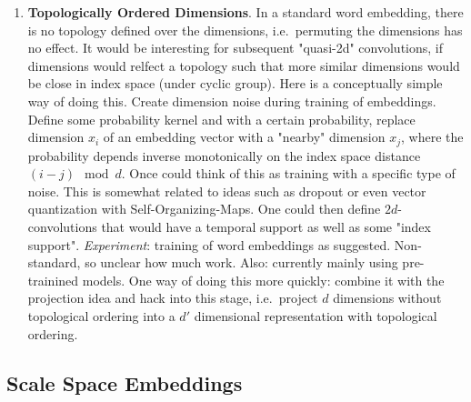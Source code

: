 \documentclass{article}
\begin{document}
\begin{enumerate}
\item \textbf{Topologically Ordered Dimensions}. In a standard word embedding, there is no topology defined over the dimensions, i.e.~permuting the dimensions has no effect. It would be interesting for subsequent "quasi-2d" convolutions, if dimensions would relfect a topology such that more similar dimensions would be close in index space (under cyclic group).  Here is a conceptually simple way of doing this. Create dimension noise during training of embeddings. Define some probability kernel and with a certain probability, replace  dimension $x_i$ of an embedding vector with a "nearby" dimension $x_j$, where the probability depends inverse monotonically on the index space distance $(i-j) \mod  d$. Once could think of this as training with a specific type of noise. This is somewhat related to ideas such as dropout or even vector quantization with Self-Organizing-Maps. One could then define $2d$-convolutions that would have a temporal support as well as some "index support". \textit{Experiment}: training of word embeddings as suggested. Non-standard, so unclear how much work. Also: currently mainly using pre-trainined models. One way of doing this more quickly: combine it with the projection idea and hack into this stage, i.e.~project $d$ dimensions without topological ordering into a $d'$ dimensional representation with topological ordering.  
\end{enumerate}


\subsection*{Scale Space Embeddings}
\end{document}
